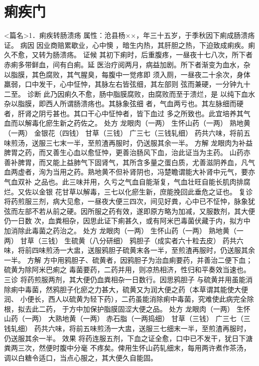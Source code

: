 \documentclass[a4paper,12pt,UTF8,twoside]{ctexbook}
\begin{document}
\chapter{痢疾门}
<篇名>1．痢疾转肠溃疡
属性：沧县杨××，年三十五岁，于季秋因下痢成肠溃疡证。 
病因 因业商赔累歇业，心中懊 ，暗生内热，其肝胆之热，下迫致成痢疾。痢久不愈，又转为肠溃疡。 
证候 其初下痢时，后重腹疼，一昼夜十七八次，所下者赤痢多带鲜血，间有白痢。延 
医治疗阅两月，病益加剧。所下者渐变为血水，杂以脂膜，其色腐败，其气腥臭，每腹中一觉疼即 
须入厕，一昼夜二十余次，身体羸弱，口中发干，心中怔忡，其脉左右皆弦细，其左部则 
弦而兼硬，一分钟九十二至。 
诊断 此乃因痢久不愈，肠中脂膜腐败，由腐败而至于溃烂，是 
以纯下血水杂以脂膜，即西人所谓肠溃疡也。其脉象弦细 
者，气血两亏也。其左脉细而硬者，肝肾之阴亏甚也。其口干心中怔忡者，皆下血过 
多之所致也。此宜培养其气血而以解毒化瘀生新之药佐之。 
处方 龙眼肉（一两） 生怀山药（一两） 熟地黄（一两） 金银花（四钱） 
甘草（三钱） 广三七（三钱轧细） 
药共六味，将前五味煎汤，送服三七末一半，至煎渣再服时，仍送服其余一半。 
方解 龙眼肉为补益脾胃之药，而又善生心血以愈怔忡，更善治肠风下血，治此证当为主药。 
山药亦善补脾胃，而又能上益肺气下固肾气，其所含多量之蛋白质，尤善滋阴养血，凡气 
血两虚者，洵为当用之药。熟地黄不但补肾阴也，冯楚瞻谓能大补肾中元气，要亦气血双补 
之品也。此三味并用，久亏之气血自能渐复，气血壮旺自能长肌肉排腐烂。又佐以金银 
花甘草以解毒，三七以化瘀生新，庶能挽回此垂危之证也。 
复诊 将药煎服三剂，病大见愈，一昼夜大便三四次，间见好粪，心中已不怔忡，脉象犹 
弦而左部不若从前之硬。因所服之药有效，遂即原方略为加减，又服数剂，其大便仍一日数 
次，血粪相杂，因思此证下痢甚久，或有阿米巴毒菌伏藏于内，拟方中加消除此毒菌之药治之。 
处方 龙眼肉（一两） 生怀山药（一两） 熟地黄（一两） 甘草（三钱） 
生硫黄（八分研细） 鸦胆子（成实者六十粒去皮） 
药共六味，将前四味煎汤一大盅，送服鸦胆子硫黄末各一半，至煎渣再服时，仍送服其余一半。 
方解 方中用鸦胆子、硫黄者，因鸦胆子为治血痢要药，并善治二便下血；硫黄为除阿米巴痢之 
毒菌要药，二药并用，则凉热相济，性归和平奏效当速也。 
三诊 将药煎服两剂，其大便仍血粪相杂一日数行。因思鸦胆子 
与硫黄并用虽能消除痢中毒菌，然鸦胆子化瘀之力甚大，硫黄又为润大便之药（本草谓其能使大便润、 
小便长，西人以硫黄为轻下药），二药虽能消除痢中毒菌，究难使此病完全除根，拟去此二药， 
于方中加保护脂膜固涩大便之品。 
处方 龙眼肉（一两） 生怀山药（一两） 大熟地黄（一两） 赤石脂（一两捣细） 
甘草（三钱） 广三七（三钱轧细） 
药共六味，将前五味煎汤一大盅，送服三七细末一半，至煎渣再服时，仍送服其余一半。 
效果 将药连服五剂，下血之证全愈，口中已不发干，犹日下溏粪两三次，然便时腹中分毫 
不疼矣。俾用生怀山药轧细末，每用两许煮作茶汤，调以白糖令适口，当点心服之，其大便久自能固。 
\end{document}
